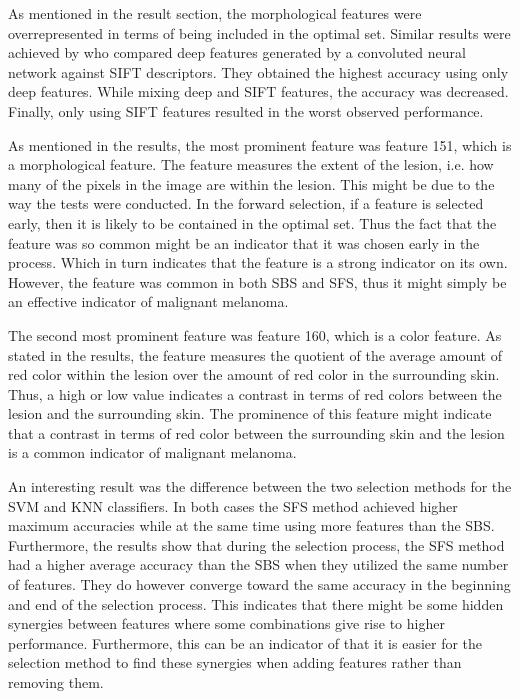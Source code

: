 \documentclass{kththesis}
\begin{document}
As mentioned in the result section, the morphological features were overrepresented in terms of being included in the optimal set. Similar results were achieved by \parencite{Zhang}
who compared deep features generated by a convoluted neural network against SIFT descriptors. They obtained the highest accuracy using only deep features. While mixing deep and SIFT features, the accuracy was decreased. Finally, only using SIFT features resulted in the worst observed performance. 

As mentioned in the results, the most prominent feature was feature 151, which is a morphological feature. The feature measures the extent of the lesion, i.e. how many of the pixels in the image are within the lesion. This might be due to the way the tests were conducted. In the forward selection, if a feature is selected early, then it is likely to be contained in the optimal set. Thus the fact that the feature was so common might be an indicator that it was chosen early in the process. Which in turn indicates that the feature is a strong indicator on its own. However, the feature was common in both SBS and SFS, thus it might simply be an effective indicator of malignant melanoma.

The second most prominent feature was feature 160, which is a color feature. As stated in the results, the feature measures the quotient of the average amount of red color within the lesion over the amount of red color in the surrounding skin. Thus, a high or low value indicates a contrast in terms of red colors between the lesion and the surrounding skin. The prominence of this feature might indicate that a contrast in terms of red color between the surrounding skin and the lesion is a common indicator of malignant melanoma. %

An interesting result was the difference between the two selection methods for the SVM and KNN classifiers. In both cases the SFS method achieved higher maximum accuracies while at the same time using more features than the SBS. Furthermore, the results  show that during the selection process, the SFS method had a higher average accuracy than the SBS when they utilized the same number of features. They do however converge toward the same accuracy in the beginning and end of the selection process. This indicates that there might be some hidden synergies between features where some combinations give rise to higher performance. Furthermore, this can be an indicator of that it is easier for the selection method to find these synergies when adding features rather than removing them.
\end{document}
